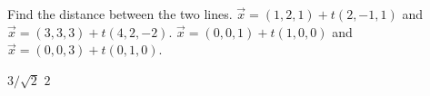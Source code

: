 
\begin{Exercise}[
name={},
title={}, 
difficulty=0,
origin={\cite{GHC}}]
Find the distance between the two lines.
\Question $\vec x = (1,2,1) + t(2,-1,1)$ and 
$\vec x = (3,3,3) + t(4,2,-2)$.
\Question $\vec x = (0,0,1) + t(1,0,0)$ and
$\vec x = (0,0,3) + t(0,1,0)$.
\end{Exercise}

\begin{Answer}
\begin{multicols}{2}
\Question $3/\sqrt{2}$
\Question $2$
\EndCurrentQuestion
\end{multicols}
\end{Answer}
